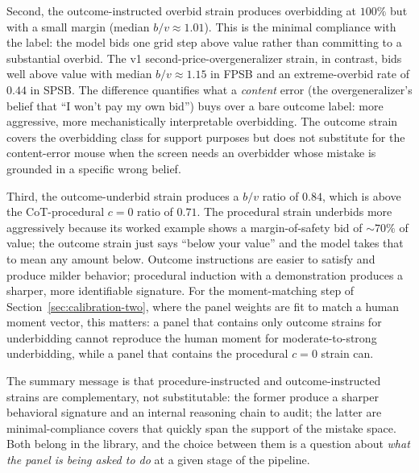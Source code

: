 \documentclass[12pt]{article}
\newcommand{\SPSB}{SPSB}
\begin{document}
Second, the outcome-instructed overbid strain produces overbidding at
$100\%$ but with a small margin (median $b/v\approx 1.01$). This is
the minimal compliance with the label: the model bids one grid step
above value rather than committing to a substantial overbid. The v1
second-price-overgeneralizer strain, in contrast, bids well above
value with median $b/v\approx 1.15$ in FPSB and an extreme-overbid
rate of $0.44$ in \SPSB{}. The difference quantifies what a
\emph{content} error (the overgeneralizer's belief that ``I won't
pay my own bid'') buys over a bare outcome label: more aggressive,
more mechanistically interpretable overbidding. The outcome strain
covers the overbidding class for support purposes but does not
substitute for the content-error mouse when the screen needs an
overbidder whose mistake is grounded in a specific wrong belief.

Third, the outcome-underbid strain produces a $b/v$ ratio of $0.84$,
which is above the CoT-procedural $c{=}0$ ratio of $0.71$. The
procedural strain underbids more aggressively because its worked
example shows a margin-of-safety bid of $\sim 70\%$ of value; the
outcome strain just says ``below your value'' and the model takes
that to mean any amount below. Outcome instructions are easier to
satisfy and produce milder behavior; procedural induction with a
demonstration produces a sharper, more identifiable signature. For
the moment-matching step of Section~\ref{sec:calibration-two}, where
the panel weights are fit to match a human moment vector, this
matters: a panel that contains only outcome strains for underbidding
cannot reproduce the human moment for moderate-to-strong
underbidding, while a panel that contains the procedural $c{=}0$
strain can.

The summary message is that procedure-instructed and
outcome-instructed strains are complementary, not substitutable: the
former produce a sharper behavioral signature and an internal
reasoning chain to audit; the latter are minimal-compliance covers
that quickly span the support of the mistake space. Both belong in
the library, and the choice between them is a question about
\emph{what the panel is being asked to do} at a given stage of the
pipeline.
\end{document}
